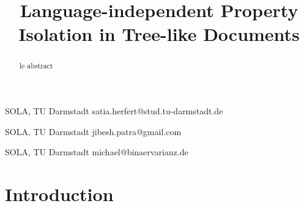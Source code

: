 \documentclass[numbers]{sigplanconf}
\begin{document}
\setlength{\pdfpageheight}{\paperheight}
\setlength{\pdfpagewidth}{\paperwidth}



\titlebanner{}        %

\title{Language-independent Property Isolation in Tree-like Documents}
\subtitle{}

           {SOLA, TU Darmstadt}
           {satia.herfert@stud.tu-darmstadt.de}
           
           {SOLA, TU Darmstadt}
           {jibesh.patra@gmail.com}
          
           {SOLA, TU Darmstadt}
           {michael@binaervarianz.de}

\maketitle

\begin{abstract}
le abstract
\end{abstract}




\section{Introduction}
\label{sec_introduction}
\end{document}
